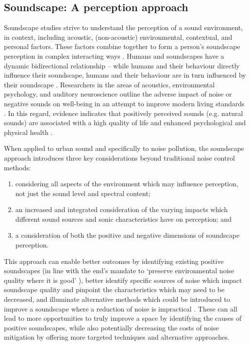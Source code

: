 \subsection{Soundscape: A perception approach}

Soundscape studies strive to understand the perception of a sound environment, in context, including acoustic, (non-acoustic) environmental, contextual, and personal factors. These factors combine together to form a person's soundscape perception in complex interacting ways \citep{Berglund2006Tool}. Humans and soundscapes have a dynamic bidirectional relationship -- while humans and their behaviour directly influence their soundscape, humans and their behaviour are in turn influenced by their soundscape \citep{Erfanian2019Psychophysiological}. Researchers in the areas of acoustics, environmental psychology, and auditory neuroscience outline the adverse impact of noise or negative sounds on well-being in an attempt to improve modern living standards \citep{Ising2004Health,Lawton2016Living,Pedersen2007Wind,Hao2016Assessment}. In this regard, evidence indicates that positively perceived sounds (e.g. natural sounds) are associated with a high quality of life and enhanced psychological and physical health \citep{Alvarsson2010Stress,Aletta2018Associations,Jeon2010Perceptual,Shepherd2013Do}.

When applied to urban sound and specifically to noise pollution, the soundscape approach introduces three key considerations beyond traditional noise control methods:

\begin{enumerate}
  \item considering all aspects of the environment which may influence perception, not just the sound level and spectral content;
  \item an increased and integrated consideration of the varying impacts which different sound sources and sonic characteristics have on perception; and
  \item a consideration of both the positive and negative dimensions of soundscape perception. 
\end{enumerate}

This approach can enable better outcomes by identifying existing positive soundscapes (in line with the \gls{end}'s mandate to `preserve environmental noise quality where it is good' \citep{Directive200249ECEuropeanUniEuropean}), better identify specific sources of noise which impact soundscape quality and pinpoint the characteristics which may need to be decreased, and illuminate alternative methods which could be introduced to improve a soundscape where a reduction of noise is impractical \citep{Kang2018Impact,Fiebig2018Does}. These can all lead to more opportunities to truly improve a space by identifying the causes of positive soundscapes, while also potentially decreasing the costs of noise mitigation by offering more targeted techniques and alternative approaches.


